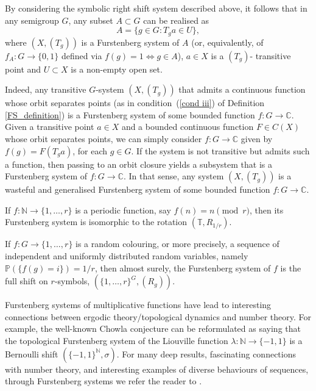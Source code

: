 \documentclass{amsart}
\numberwithin{equation}{section}
\theoremstyle{definition}
\theoremstyle{plain}
\newcommand{\C}{{\mathbb C}}
\newcommand{\N}{{\mathbb N}}
\newcommand{\T}{{\mathbb T}}
\begin{document}
By considering the symbolic right shift system 
described above, it follows that 
in any semigroup $G$, any subset $A\subset G$ can be 
realised as 
$$A=\{g\in G: T_ga \in U\},$$ 
where $(X,(T_g))$ is a Furstenberg 
system of $A$ (or, equivalently, of $f_A:G\to \{0,1\}$ 
defined via $f(g)=1\iff g\in A$), $a\in X$ is a $(T_g)$-
transitive point and $U\subset X$ is a non-empty open 
set. 

Indeed, any transitive $G$-system $(X,(T_g))$ that admits a 
continuous function whose orbit separates points (as in condition~(\ref{cond iii}) of Definition \ref{FS_definition}) is a Furstenberg 
system of some bounded function $f:G\to \C$. Given a 
transitive point $a\in X$ and a bounded continuous 
function 
$F\in C(X)$ whose orbit separates points, we can simply 
consider $f:G\to \C$ given by $f(g)=F(T_ga)$, for each 
$g\in G$. If the system is not transitive but admits 
such a function, then passing to an orbit closure 
yields a subsystem that is a Furstenberg system of 
$f: G \to \mathbb{C}$. In that sense, any system $(X,(T_g))$ is a wasteful and generalised Furstenberg system of some bounded
function $f:G\to \C$.

If $f:\N \to \{1,\ldots,r\}$ is a periodic function, 
say $f(n)=n \pmod{r}$, then its Furstenberg system is 
isomorphic to the rotation $(\T,R_{1/r})$.

If $f:G\to \{1,\ldots,r\}$ is a random colouring, or
more precisely, a sequence of independent and uniformly distributed random variables, namely 
$\mathbb{P}(\{f(g)=i\})=1/r$, then almost surely, the 
Furstenberg system of $f$ is the full shift on 
$r$-symbols, $(\{1,\ldots,r\}^G,(R_g))$.

Furstenberg systems of multiplicative 
functions have lead to interesting connections between 
ergodic theory/topological dynamics and number theory. 
For example, the well-known Chowla conjecture can be 
reformulated as saying that the topological Furstenberg 
system of the Liouville function 
$\lambda:\N\to \{-1,1\}$ is a Bernoulli shift $(\{-1,1\}^\N,\sigma)$. For many deep results, fascinating connections with number theory, 
and interesting examples of diverse behaviours of 
sequences, through Furstenberg systems we refer the reader to \cite{Frantz_2, Frantz_1, Frantz_Host, Frantz_Lem_Rue, Gomilko_Lem_Rue, Kouts_Moragues}.
\end{document}
